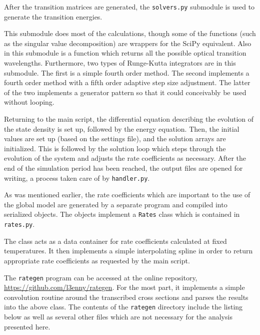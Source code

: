 After the transition matrices are generated, the \texttt{solvers.py} submodule
is used to generate the transition energies.
\begin{singlespace}
  
\end{singlespace}
This submodule does most of the calculations, though some of the functions (such
as the singular value decomposition) are wrappers for the SciPy equivalent. Also
in this submodule is a function which returns all the possible optical
transition wavelengths. Furthermore, two types of Runge-Kutta integrators are in
this submodule. The first is a simple fourth order method. The second implements
a fourth order method with a fifth order adaptive step size adjustment. The
latter of the two implements a generator pattern so that it could conceivably be
used without looping.

Returning to the main script, the differential equation describing the evolution
of the state density is set up, followed by the energy equation. Then, the
initial values are set up (based on the settings file), and the solution arrays
are initialized. This is followed by the solution loop which steps through the
evolution of the system and adjusts the rate coefficients as necessary. After
the end of the simulation period has been reached, the output files are opened
for writing, a process taken care of by \texttt{handler.py}.
\begin{singlespace}
  
\end{singlespace}

As was mentioned earlier, the rate coefficients which are important to the use
of the global model are generated by a separate program and compiled into
serialized objects. The objects implement a \texttt{Rates} class which is
contained in \texttt{rates.py}.
\begin{singlespace}
  
\end{singlespace}
The class acts as a data container for rate coefficients calculated at fixed
temperatures. It then implements a simple interpolating spline in order to
return appropriate rate coefficients as requested by the main script.

The \texttt{rategen} program can be accessed at the online repository,
\url{https://github.com/l3enny/rategen}. For the most part, it implements a
simple convolution routine around the transcribed cross sections and parses the
results into the above class. The contents of the \texttt{rategen} directory
include the listing below as well as several other files which are not necessary
for the analysis presented here.

